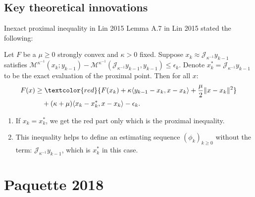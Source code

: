 \documentclass[11pt]{beamer}
\begin{document}
        \subsection{Key theoretical innovations}
            \begin{frame}{Inexact proximal inequality in Lin 2015}
                Lemma A.7 in Lin 2015 \cite{lin_universal_2015} stated the following: 
                \begin{lemma}
                    Let $F$ be a $\mu\ge 0$ strongly convex and $\kappa > 0$ fixed. 
                    Suppose $x_k \approx \mathcal J_{\kappa^{-1}} y_{k - 1}$ satisfies $\mathcal M^{\kappa^{-1}}(x_k; y_{k - 1}) - \mathcal M^{\kappa^{-1}}(\mathcal J_{\kappa^{-1}} y_{k - 1}, y_{k - 1}) \le \epsilon_k$. 
                    Denote $x_k^* = \mathcal J_{\kappa^{-1}} y_{k - 1}$ to be the exact evaluation of the proximal point. Then for all $x$: 
                        \begin{align*}   
                            F(x) &\ge 
                            \textcolor{red}{
                                F(x_k) + \kappa \langle y_{k - 1} - x_k, x - x_k\rangle
                                + \frac{\mu}{2}\Vert x - x_k\Vert^2 
                            }
                            \\
                            & \quad 
                            + (\kappa + \mu)\langle  x_k - x_k^*, x - x_k\rangle 
                            - \epsilon_k.
                        \end{align*}
                \end{lemma}
                \begin{enumerate}
                    \item If $x_k=x^*_k$, we get the red part only which is the proximal inequality. 
                    \item This inequality helps to define an estimating sequence $(\phi_k)_{k \ge 0}$ without the term: $\mathcal J_{\kappa^{-1}}y_{k - 1}$, which is $x_k^*$ in this case. 
                \end{enumerate}
            \end{frame}

\section{Paquette 2018}
\end{document}
